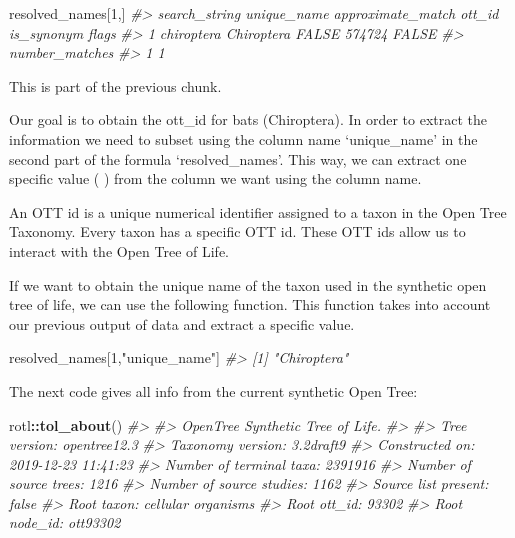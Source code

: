 \documentclass[]{article}
\newenvironment{Shaded}{\begin{snugshade}}{\end{snugshade}}
\newcommand{\CommentTok}[1]{\textcolor[rgb]{0.56,0.35,0.01}{\textit{#1}}}
\newcommand{\DecValTok}[1]{\textcolor[rgb]{0.00,0.00,0.81}{#1}}
\newcommand{\KeywordTok}[1]{\textcolor[rgb]{0.13,0.29,0.53}{\textbf{#1}}}
\newcommand{\NormalTok}[1]{#1}
\newcommand{\OperatorTok}[1]{\textcolor[rgb]{0.81,0.36,0.00}{\textbf{#1}}}
\newcommand{\StringTok}[1]{\textcolor[rgb]{0.31,0.60,0.02}{#1}}
\begin{document}
\begin{Shaded}
\begin{Highlighting}[]
\NormalTok{resolved_names[}\DecValTok{1}\NormalTok{,]}
\CommentTok{#>   search_string unique_name approximate_match ott_id is_synonym flags}
\CommentTok{#> 1    chiroptera  Chiroptera             FALSE 574724      FALSE      }
\CommentTok{#>   number_matches}
\CommentTok{#> 1              1}
\end{Highlighting}
\end{Shaded}

This is part of the previous chunk.

Our goal is to obtain the ott\_id for bats (Chiroptera). In order to
extract the information we need to subset using the column name
`unique\_name' in the second part of the formula `resolved\_names'. This
way, we can extract one specific value ( ) from the column we want using
the column name.

An OTT id is a unique numerical identifier assigned to a taxon in the
Open Tree Taxonomy. Every taxon has a specific OTT id. These OTT ids
allow us to interact with the Open Tree of Life.

If we want to obtain the unique name of the taxon used in the synthetic
open tree of life, we can use the following function. This function
takes into account our previous output of data and extract a specific
value.

\begin{Shaded}
\begin{Highlighting}[]
\NormalTok{resolved_names[}\DecValTok{1}\NormalTok{,}\StringTok{"unique_name"}\NormalTok{]}
\CommentTok{#> [1] "Chiroptera"}
\end{Highlighting}
\end{Shaded}

The next code gives all info from the current synthetic Open Tree:

\begin{Shaded}
\begin{Highlighting}[]
\NormalTok{rotl}\OperatorTok{::}\KeywordTok{tol_about}\NormalTok{()}
\CommentTok{#> }
\CommentTok{#> OpenTree Synthetic Tree of Life.}
\CommentTok{#> }
\CommentTok{#> Tree version: opentree12.3}
\CommentTok{#> Taxonomy version: 3.2draft9}
\CommentTok{#> Constructed on: 2019-12-23 11:41:23}
\CommentTok{#> Number of terminal taxa: 2391916}
\CommentTok{#> Number of source trees: 1216}
\CommentTok{#> Number of source studies: 1162}
\CommentTok{#> Source list present: false}
\CommentTok{#> Root taxon: cellular organisms}
\CommentTok{#> Root ott_id: 93302}
\CommentTok{#> Root node_id: ott93302}
\end{Highlighting}
\end{Shaded}
\end{document}
